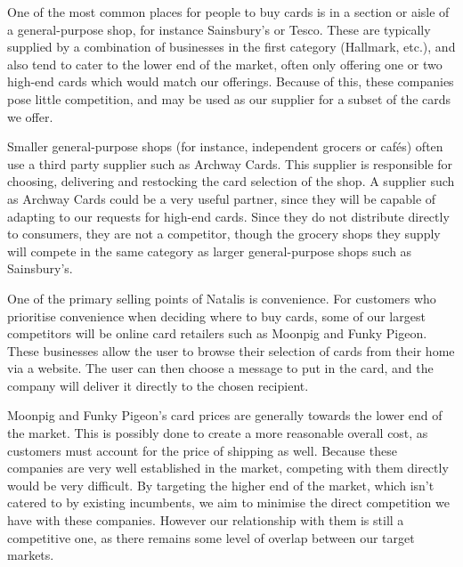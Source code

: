 \documentclass[10pt, a4paper]{article}
\begin{document}
One of the most common places for people to buy cards is in a section or aisle of a general-purpose shop, for instance Sainsbury's or Tesco. These are typically supplied by a combination of businesses in the first category (Hallmark, etc.), and also tend to cater to the lower end of the market, often only offering one or two high-end cards which would match our offerings. Because of this, these companies pose little competition, and may be used as our supplier for a subset of the cards we offer.

Smaller general-purpose shops (for instance, independent grocers or cafés) often use a third party supplier such as Archway Cards. This supplier is responsible for choosing, delivering and restocking the card selection of the shop. A supplier such as Archway Cards could be a very useful partner, since they will be capable of adapting to our requests for high-end cards. Since they do not distribute directly to consumers, they are not a competitor, though the grocery shops they supply will compete in the same category as larger general-purpose shops such as Sainsbury's.


One of the primary selling points of Natalis is convenience. For customers who prioritise convenience when deciding where to buy cards, some of our largest competitors will be online card retailers such as Moonpig and Funky Pigeon. These businesses allow the user to browse their selection of cards from their home via a website. The user can then choose a message to put in the card, and the company will deliver it directly to the chosen recipient.

Moonpig and Funky Pigeon's card prices are generally towards the lower end of the market. This is possibly done to create a more reasonable overall cost, as customers must account for the price of shipping as well. Because these companies are very well established in the market, competing with them directly would be very difficult. By targeting the higher end of the market, which isn't catered to by existing incumbents, we aim to minimise the direct competition we have with these companies. However our relationship with them is still a competitive one, as there remains some level of overlap between our target markets.
\end{document}
